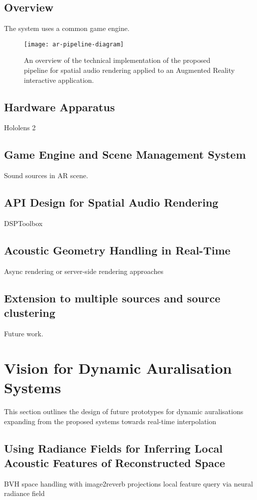 \subsection{Overview}
The system uses a common game engine.
\begin{figure}[htb]
    \centering
    \texttt{[image: ar-pipeline-diagram]}
    \caption{An overview of the technical implementation of the proposed pipeline for spatial audio rendering applied to an Augmented Reality interactive application. }
    \label{fig:ar-pipeline-overview}
\end{figure}

\subsection{Hardware Apparatus}
Hololens 2

\subsection{Game Engine and Scene Management System}
Sound sources in AR scene.

\subsection{API Design for Spatial Audio Rendering}
DSPToolbox

\subsection{Acoustic Geometry Handling in Real-Time}
Async rendering or server-side rendering approaches

\subsection{Extension to multiple sources and source clustering}
Future work.


\section{Vision for Dynamic Auralisation Systems}
This section outlines the design of future prototypes for dynamic auralisations expanding from the proposed systems towards real-time interpolation 

\subsection{Using Radiance Fields for Inferring Local Acoustic Features of Reconstructed Space}

BVH space handling with image2reverb projections
local feature query via neural radiance field

